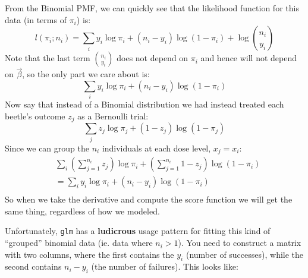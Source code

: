 \documentclass[
]{article}
\newenvironment{Shaded}{\begin{snugshade}}{\end{snugshade}}
\newcommand{\AttributeTok}[1]{\textcolor[rgb]{0.77,0.63,0.00}{#1}}
\newcommand{\FunctionTok}[1]{\textcolor[rgb]{0.00,0.00,0.00}{#1}}
\newcommand{\NormalTok}[1]{#1}
\newcommand{\OtherTok}[1]{\textcolor[rgb]{0.56,0.35,0.01}{#1}}
\newcommand{\SpecialCharTok}[1]{\textcolor[rgb]{0.00,0.00,0.00}{#1}}
\newcommand{\StringTok}[1]{\textcolor[rgb]{0.31,0.60,0.02}{#1}}
\begin{document}
From the Binomial PMF, we can quickly see that the likelihood function
for this data (in terms of \(\pi_i\)) is: \[
l(\pi_i;n_i) = \sum_i y_i \log\pi_i + (n_i-y_i) \log(1-\pi_i) + \log{{n_i \choose y_i}}
\] Note that the last term \({n_i \choose y_i}\) does not depend on
\(\pi_i\) and hence will not depend on \(\vec{\beta}\), so the only part
we care about is: \[
 \sum_i y_i \log\pi_i + (n_i-y_i) \log(1-\pi_i)
\] Now say that instead of a Binomial distribution we had instead
treated each beetle's outcome \(z_j\) as a Bernoulli trial: \[
 \sum_j z_j \log\pi_j + (1-z_j) \log(1-\pi_j)
\] Since we can group the \(n_i\) individuals at each dose level,
\(x_j = x_i\): \[
\begin{split}
&\sum_i \left(\sum_{j=1}^{n_i} z_j\right) \log\pi_i + \left(\sum_{j=1}^{n_i} 1-z_j \right) \log(1-\pi_i) \\
 &= \sum_i y_i \log\pi_i + (n_i - y_i) \log(1-\pi_i) \\
\end{split}
\] So when we take the derivative and compute the score function we will
get the same thing, regardless of how we modeled.

Unfortunately, \texttt{glm} has a \textbf{ludicrous} usage pattern for
fitting this kind of ``grouped'' binomial data (ie. data where
\(n_i>1\)). You need to construct a matrix with two columns, where the
first contains the \(y_i\) (number of successes), while the second
contains \(n_i-y_i\) (the number of failures). This looks like:

\begin{Shaded}
\end{Shaded}
\end{document}
